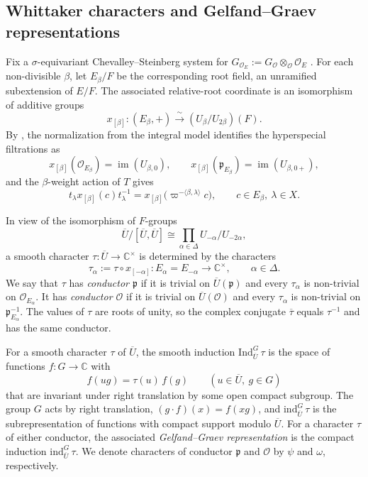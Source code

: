 \documentclass[12pt]{article}
\numberwithin{equation}{section}
\theoremstyle{definition}
\theoremstyle{remark}
\theoremstyle{plain}
\begin{document}
\subsection{Whittaker characters and Gelfand--Graev representations}
Fix a $\sigma$-equivariant Chevalley--Steinberg system for $G_{\mathcal O_E}:=G_{\mathcal O}\otimes_{\mathcal O}\mathcal O_E$ \cite[Definition 2.9.15]{KP}. For each non-divisible $\beta$, let $E_\beta/F$ be the corresponding root field, an unramified subextension of $E/F$. The associated relative-root coordinate \cite[Construction 2.9.16]{KP} is an isomorphism of additive groups
$$x_{[\beta]}:(E_\beta,+)\xrightarrow{\ \sim\ }(U_\beta/U_{2\beta})(F).$$
By \cite[Lemma 9.6.3]{KP}, the normalization from the integral model identifies the hyperspecial filtrations as
$$x_{[\beta]}(\mathcal O_{E_\beta})=\operatorname{im}(U_{\beta,0}),\qquad x_{[\beta]}(\mathfrak p_{E_\beta})=\operatorname{im}(U_{\beta,0+}),$$
and the $\beta$-weight action of $T$ gives
\begin{equation}\label{eq:root_coordinate_shift}
t_\lambda x_{[\beta]}(c)t_\lambda^{-1}=x_{[\beta]}\bigl(\varpi^{-\langle\beta,\lambda\rangle}c\bigr),\qquad c\in E_\beta,\ \lambda\in X.
\end{equation}

In view of the isomorphism of $F$-groups
$$\overline U/[\overline U,\overline U]\cong\prod_{\alpha\in\Delta}U_{-\alpha}/U_{-2\alpha},$$
a smooth character $\tau : \overline{U} \to \mathbb{C}^\times$ is determined by the characters
$$\tau_\alpha := \tau \circ x_{[-\alpha]} : E_\alpha=E_{-\alpha} \longrightarrow \mathbb{C}^\times, \qquad \alpha \in \Delta.$$
We say that $\tau$ has \emph{conductor $\mathfrak p$} if it is trivial on $\overline U(\mathfrak p)$ and every $\tau_\alpha$ is non-trivial on $\mathcal O_{E_\alpha}$. It has \emph{conductor $\mathcal O$} if it is trivial on $\overline U(\mathcal O)$ and every $\tau_\alpha$ is non-trivial on $\mathfrak p_{E_\alpha}^{-1}$. The values of $\tau$ are roots of unity, so the complex conjugate $\overline{\tau}$ equals $\tau^{-1}$ and has the same conductor.

For a smooth character $\tau$ of $\overline{U}$, the smooth induction $\mathrm{Ind}_{\overline{U}}^{G}\,\tau$ is the space of functions $f : G \to \mathbb{C}$ with
$$f(ug) = \tau(u)\,f(g) \qquad (u \in \overline{U},\ g \in G)$$
that are invariant under right translation by some open compact subgroup. The group $G$ acts by right translation, $(g \cdot f)(x) = f(xg)$, and $\mathrm{ind}_{\overline{U}}^{G}\,\tau$ is the subrepresentation of functions with compact support modulo $\overline{U}$. For a character $\tau$ of either conductor, the associated \emph{Gelfand--Graev representation} is the compact induction $\mathrm{ind}_{\overline{U}}^{G}\,\tau$. We denote characters of conductor $\mathfrak p$ and $\mathcal O$ by $\psi$ and $\omega$, respectively.
\end{document}
